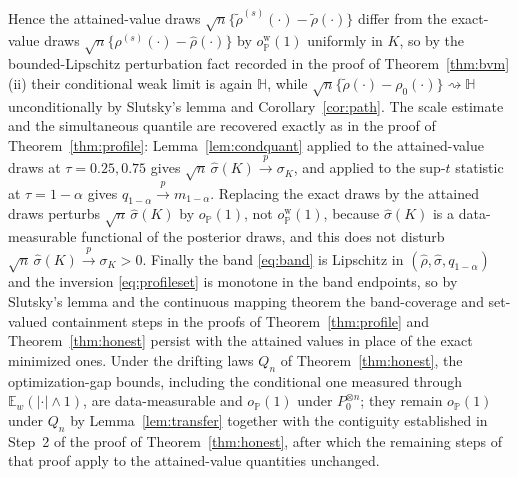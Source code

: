 \documentclass[11pt]{article}
\newcommand{\E}{\mathbb E}
\newcommand{\Pp}{\mathbb P}
\newcommand{\opro}{o_{\Pp}}
\newcommand{\dto}{\rightsquigarrow}
\newcommand{\pto}{\overset{p}{\to}}
\begin{document}
Hence the attained-value draws $\sqrt n\{\tilde\rho^{(s)}(\cdot)-\tilde\rho(\cdot)\}$ differ from the exact-value draws $\sqrt n\{\rho^{(s)}(\cdot)-\hat\rho(\cdot)\}$ by $\opro^{\mathrm w}(1)$ uniformly in $K$, so by the bounded-Lipschitz perturbation fact recorded in the proof of Theorem~\ref{thm:bvm}\textup{(ii)} their conditional weak limit is again $\mathbb H$, while $\sqrt n\{\tilde\rho(\cdot)-\rho_0(\cdot)\}\dto\mathbb H$ unconditionally by Slutsky's lemma and Corollary~\ref{cor:path}. The scale estimate and the simultaneous quantile are recovered exactly as in the proof of Theorem~\ref{thm:profile}: Lemma~\ref{lem:condquant} applied to the attained-value draws at $\tau=0.25,0.75$ gives $\sqrt n\,\hat\sigma(K)\pto\sigma_K$, and applied to the sup-$t$ statistic at $\tau=1-\alpha$ gives $q_{1-\alpha}\pto m_{1-\alpha}$. Replacing the exact draws by the attained draws perturbs $\sqrt n\,\hat\sigma(K)$ by $\opro(1)$, not $\opro^{\mathrm w}(1)$, because $\hat\sigma(K)$ is a data-measurable functional of the posterior draws, and this does not disturb $\sqrt n\,\hat\sigma(K)\pto\sigma_K>0$. Finally the band \eqref{eq:band} is Lipschitz in $(\hat\rho,\hat\sigma,q_{1-\alpha})$ and the inversion \eqref{eq:profileset} is monotone in the band endpoints, so by Slutsky's lemma and the continuous mapping theorem the band-coverage and set-valued containment steps in the proofs of Theorem~\ref{thm:profile} and Theorem~\ref{thm:honest} persist with the attained values in place of the exact minimized ones. Under the drifting laws $Q_n$ of Theorem~\ref{thm:honest}, the optimization-gap bounds, including the conditional one measured through $\E_w(|\cdot|\wedge1)$, are data-measurable and $\opro(1)$ under $P_0^{\otimes n}$; they remain $\opro(1)$ under $Q_n$ by Lemma~\ref{lem:transfer} together with the contiguity established in Step~2 of the proof of Theorem~\ref{thm:honest}, after which the remaining steps of that proof apply to the attained-value quantities unchanged.
\end{document}
